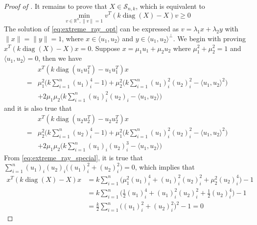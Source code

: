 \documentclass[11pt]{amsart}
\newcommand{\Szero}[2]{\ensuremath{\mathcal{S}_{#1,#2}}}
\theoremstyle{plain}
\theoremstyle{definition}
\theoremstyle{remark}
\newcommand{\RR}{\mathbb{R}}
\DeclareMathOperator{\diag}{diag}
\begin{document}
\begin{appendices}
\begin{proof}[Proof of ]
		It remains to prove that \(X\in\Szero{n}{k}\), which is equivalent to 
		\begin{equation}\label{eq:extreme_ray_opt}
			\min_{v\in\RR^n, \|v\|=1} v^T(k\diag(X)-X)v \geq 0
		\end{equation}
        The solution of \eqref{eq:extreme_ray_opt} can be expressed as \(v = \lambda_1x + \lambda_2y\) with \(\|x\|=\|y\|=1\), where \(x\in \langle u_1,u_2\rangle\) and \(y\in \langle u_1,u_2\rangle^\perp\).
		We begin with proving \(x^T(k\diag(X)-X)x=0\). Suppose \(x=\mu_1u_1 + \mu_2u_2\) where \(\mu_1^2 + \mu_2^2=1\) and \(\langle u_1,u_2\rangle=0\), then we have
        \begin{equation}
            \begin{split}
                & x^T(k\diag(u_1u_1^T)-u_1u_1^T)x \\ =
                & \mu_1^2\Big(k\sum_{i=1}^n (u_1)_i^4 - 1\Big) + \mu_2^2 \Big(k\sum_{i=1}^n (u_1)_i^2(u_2)_i^2 - \langle u_1,u_2\rangle^2\Big)\\
                & + 2\mu_1\mu_2\Big(k\sum_{i=1}^n (u_1)^2_i(u_2)_i - \langle u_1,u_2\rangle\Big)
            \end{split}
        \end{equation}
        and it is also true that
         \begin{equation}
            \begin{split}
                & x^T(k\diag(u_2u_2^T)-u_2u_2^T)x \\ =
                & \mu_2^2\Big(k\sum_{i=1}^n (u_2)_i^4 - 1\Big) 
                 + \mu_1^2\Big(k\sum_{i=1}^n (u_1)_i^2(u_2)_i^2 - \langle u_1,u_2\rangle^2\Big)\\
                 & + 2\mu_1\mu_2\Big(k\sum_{i=1}^n (u_1)_i(u_2)_i^3 - \langle u_1,u_2\rangle\Big)
            \end{split}
        \end{equation}
        From \eqref{eq:extreme_ray_special}, it is true that 
        \(\sum_{i=1}^n(u_1)_i(u_2)_i\big((u_1)^2_i+(u_2)^2_i\big) = 0\), which implies that
        \begin{equation}
            \begin{split}
                x^T(k\diag(X)-X)x &= k\sum_{i=1}^n\big(\mu_1^2(u_1)_i^4+(u_1)_i^2(u_2)_i^2+\mu_2^2(u_2)_i^4\big)-1\\
                &= k\sum_{i=1}^n\big(\tfrac{1}{2}(u_1)_i^4+(u_1)_i^2(u_2)_i^2+\tfrac{1}{2}(u_2)_i^4\big)-1\\
                &= \frac{k}{2}\sum_{i=1}^n\big((u_1)_i^2+(u_2)_i^2\big)^2-1 = 0

\end{split}
\end{equation}
\end{proof}
\end{appendices}
\end{document}
